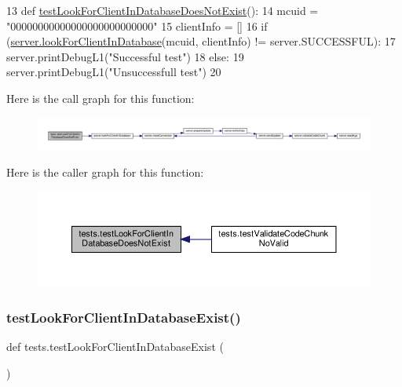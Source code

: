 \begin{DoxyCode}
13 \textcolor{keyword}{def }\hyperlink{namespacetests_aa01c1b55c064d435f5ce63b79f8042a5}{testLookForClientInDatabaseDoesNotExist}():
14      mcuid = \textcolor{stringliteral}{"00000000000000000000000000"}
15      clientInfo = []
16      \textcolor{keywordflow}{if} (\hyperlink{namespaceserver_a998e5671e2ab0c79b9abe44e87e203a0}{server.lookForClientInDatabase}(mcuid, clientInfo) != 
      server.SUCCESSFUL):
17           server.printDebugL1(\textcolor{stringliteral}{"Successful test"})
18      \textcolor{keywordflow}{else}:
19           server.printDebugL1(\textcolor{stringliteral}{"Unsuccessfull test"})
20 
\end{DoxyCode}
Here is the call graph for this function\+:
\nopagebreak
\begin{figure}[H]
\begin{center}
\leavevmode
\includegraphics[width=350pt]{namespacetests_aa01c1b55c064d435f5ce63b79f8042a5_cgraph}
\end{center}
\end{figure}
Here is the caller graph for this function\+:
\nopagebreak
\begin{figure}[H]
\begin{center}
\leavevmode
\includegraphics[width=350pt]{namespacetests_aa01c1b55c064d435f5ce63b79f8042a5_icgraph}
\end{center}
\end{figure}
\mbox{\label{namespacetests_ab9d8846c7694143044a37e86e9447600}} 
\subsubsection{\texorpdfstring{test\+Look\+For\+Client\+In\+Database\+Exist()}{testLookForClientInDatabaseExist()}}
{\footnotesize\ttfamily def tests.\+test\+Look\+For\+Client\+In\+Database\+Exist (\begin{DoxyParamCaption}{ }\end{DoxyParamCaption})}


